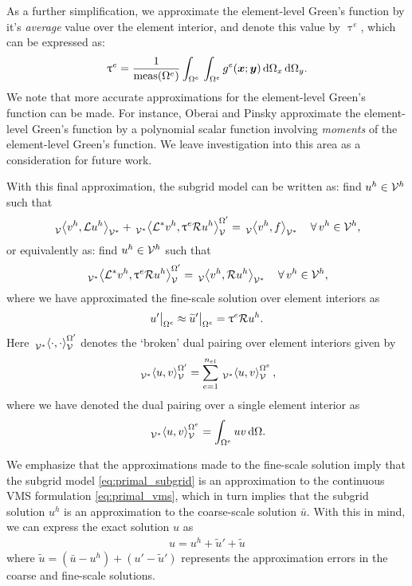 As a further simplification, we approximate the
element-level Green's function by it's \emph{average}
value over the element interior, and denote this
value by $\uptau^e$, which can be expressed as:
%
\begin{gather}
\uptau^e = \frac{1}{\text{meas}(\Omega^e)}
\int_{\Omega^e} \, \int_{\Omega^e}
g^e (\boldsymbol{x}; \boldsymbol{y}) \, \text{d} \Omega_x \, \text{d} \Omega_y.
\label{eq:primal_tau}
\end{gather}
%
We note that more accurate approximations for the
element-level Green's function can be made. For instance,
Oberai and Pinsky \cite{oberai1998multiscale} approximate
the element-level Green's function by a polynomial scalar
function involving \emph{moments} of the element-level
Green's function. We leave investigation into this area
as a consideration for future work.

With this final approximation, the subgrid model
can be written as: find $u^h \in \mathcal{V}^h$ such that
%
\begin{gather}
\,{}_{\mathcal{V}}^{}\!\left< {v^h}, {\mathcal{L} u^h} \right>_{\mathcal{V}^*} +
\,{}_{\mathcal{V}^*}^{}\!\left< {\mathcal{L}^* v^h}, {\uptau^e \mathcal{R} u^h} \right>_{\mathcal{V}}^{\Omega'} =
\,{}_{\mathcal{V}}^{}\!\left< {v^h}, {f} \right>_{\mathcal{V}^*}
\quad \forall \, v^h \in \mathcal{V}^h,
\label{eq:primal_subgrid}
\end{gather}
%
or equivalently as: find $u^h \in \mathcal{V}^h$ such that
%
\begin{gather}
\,{}_{\mathcal{V}^*}^{}\!\left< {\mathcal{L}^* v^h}, {\uptau^e \mathcal{R} u^h} \right>_{\mathcal{V}}^{\Omega'} =
\,{}_{\mathcal{V}}^{}\!\left< {v^h}, {\mathcal{R} u^h} \right>_{\mathcal{V}^*} \quad \forall \, v^h \in \mathcal{V}^h,
\label{eq:primal_subgrid_2}
\end{gather}
%
where we have approximated the fine-scale solution
over element interiors as
%
\begin{gather}
u' \bigr|_{\Omega^e} \approx
\widetilde{u}' \bigr|_{\Omega^e} =
\uptau^e \mathcal{R} u^h.
\label{eq:primal_fine_approx}
\end{gather}
%
Here $\,{}_{\mathcal{V}^*}^{}\!\left< {\cdot}, {\cdot} \right>_{\mathcal{V}}^{\Omega'}$ denotes the `broken'
dual pairing over element interiors given by
%
\begin{gather}
\,{}_{\mathcal{V}^*}^{}\!\left< {u}, {v} \right>_{\mathcal{V}}^{\Omega'} = 
\sum_{e=1}^{n_{el}} \,{}_{\mathcal{V}^*}^{}\!\left< {u}, {v} \right>_{\mathcal{V}}^{\Omega^e},
\end{gather}
where we have denoted the dual pairing over a single
element interior as
%
\begin{gather}
\,{}_{\mathcal{V}^*}^{}\!\left< {u}, {v} \right>_{\mathcal{V}}^{\Omega^e} =
\int_{\Omega^e} u v \, \text{d} \Omega.
\end{gather}

We emphasize that the approximations
made to the fine-scale solution imply that
the subgrid model \eqref{eq:primal_subgrid}
is an approximation to the continuous VMS
formulation \eqref{eq:primal_vms}, which in turn
implies that the subgrid solution $u^h$ is
an approximation to the coarse-scale
solution $\bar{u}$. With this in mind, we
can express the exact solution $u$ as
%
\begin{gather}
u = u^h + \tilde{u}' + \tilde{u}
\label{eq:primal_subgrid_decomp}
\end{gather}
%
where $\tilde{u} = (\bar{u} - u^h) + (u' - \tilde{u}')$
represents the approximation errors in the coarse
and fine-scale solutions.


